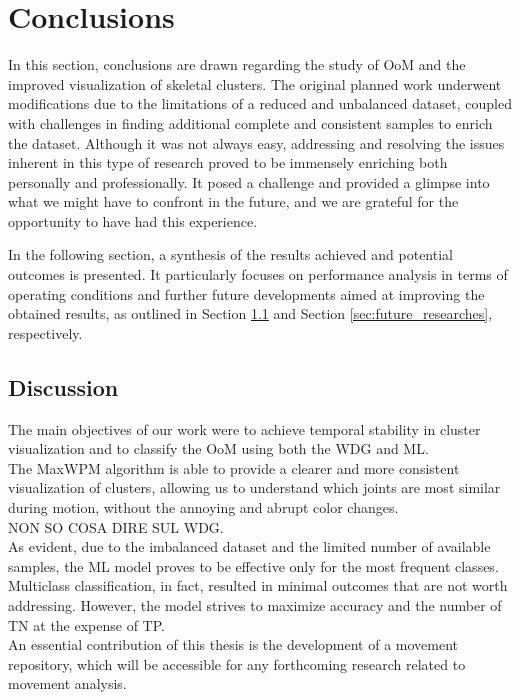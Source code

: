 \chapter{Conclusions}
In this section, conclusions are drawn regarding the study of OoM and the improved visualization of skeletal clusters.
The original planned work underwent modifications due to the limitations of a reduced and unbalanced dataset, coupled with challenges in finding additional complete and consistent samples to enrich the dataset.
Although it was not always easy, addressing and resolving the issues inherent in this type of research proved to be immensely enriching both personally and professionally.
It posed a challenge and provided a glimpse into what we might have to confront in the future, and we are grateful for the opportunity to have had this experience.

In the following section, a synthesis of the results achieved and potential outcomes is presented.
It particularly focuses on performance analysis in terms of operating conditions and further future developments aimed at improving the obtained results, as outlined in Section \ref{sec:discussion} and Section \ref{sec:future_researches}, respectively.

\section{Discussion}
\label{sec:discussion}
The main objectives of our work were to achieve temporal stability in cluster visualization and to classify the OoM using both the WDG and ML. \\

The MaxWPM algorithm is able to provide a clearer and more consistent visualization of clusters, allowing us to understand which joints are most similar during motion, without the annoying and abrupt color changes. \\

NON SO COSA DIRE SUL WDG. \\

As evident, due to the imbalanced dataset and the limited number of available samples, the ML model proves to be effective only for the most frequent classes.
Multiclass classification, in fact, resulted in minimal outcomes that are not worth addressing.
However, the model strives to maximize accuracy and the number of TN at the expense of TP. \\

An essential contribution of this thesis is the development of a movement repository, which will be accessible for any forthcoming research related to movement analysis.



